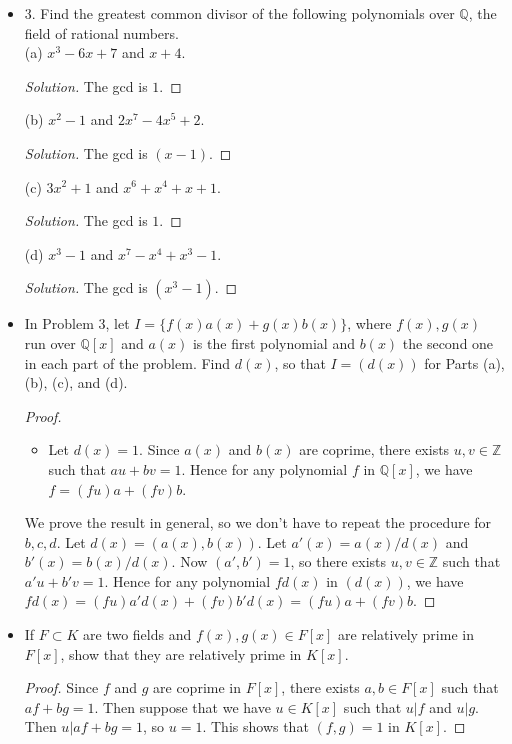\begin{itemize}
	\item 3. Find the greatest common divisor of the following polynomials over $\mathbb{Q}$, the field of rational numbers.\\
(a) $x^3-6 x+7$ and $x+4$.
\begin{proof}[Solution]
	The gcd is $1$.
\end{proof}

(b) $x^2-1$ and $2 x^7-4 x^5+2$.
\begin{proof}[Solution]
	The gcd is $(x-1)$.
\end{proof}

(c) $3 x^2+1$ and $x^6+x^4+x+1$.
\begin{proof}[Solution]
	The gcd is $1$.
\end{proof}

(d) $x^3-1$ and $x^7-x^4+x^3-1$.
\begin{proof}[Solution]
	The gcd is $(x^3-1)$.
\end{proof}

\item [5.] In Problem 3, let $I=\{f(x) a(x)+g(x) b(x)\}$, where $f(x), g(x)$ run over $\mathbb{Q}[x]$ and $a(x)$ is the first polynomial and $b(x)$ the second one in each part of the problem. Find $d(x)$, so that $I=(d(x))$ for Parts (a), (b), (c), and (d).
\begin{proof}
	\begin{itemize}
		\item [(a)] Let $d(x) = 1$. Since $a(x)$ and $b(x)$ are coprime, there exists $u, v \in \mathbb{Z}$ such that $a u + b v = 1$. Hence for any polynomial $f$ in $\mathbb{Q}[x]$, we have $f = (f u) a + (f v) b$.
	\end{itemize}
	We prove the result in general, so we don't have to repeat the procedure for $b, c, d$. Let $d(x) = \left( a(x), b(x) \right) $. Let $a'(x) = a(x) / d(x)$ and $b'(x) = b(x) / d(x)$. Now $(a', b') = 1$, so there exists $u, v \in \mathbb{Z}$ such that $a' u + b' v = 1$. Hence for any polynomial $f d(x)$ in $\left( d(x) \right) $, we have $f d(x) = (f u) a'd(x) + (f v) b'd(x) = (f u) a + (f v) b$.
\end{proof}

\item [12.] If $F \subset K$ are two fields and $f(x), g(x) \in F[x]$ are relatively prime in $F[x]$, show that they are relatively prime in $K[x]$.
\begin{proof}
	Since $f$ and $g$ are coprime in $F[x]$, there exists $a, b \in F[x]$ such that  $af + bg = 1$. Then suppose that we have $u \in K[x]$ such that  $u | f$ and $u | g$. Then $u | af+bg = 1$, so $u = 1$. This shows that $(f,g) = 1$ in $K[x]$.
\end{proof}


\end{itemize}
